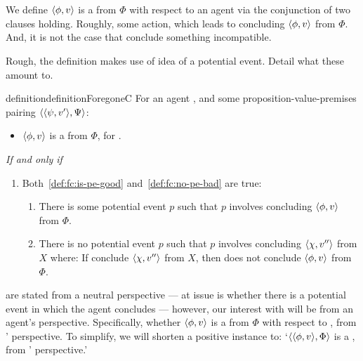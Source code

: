 \section{}
\label{cha:sec:fcs-def}

\begin{note}
  We define \(\langle \phi, v \rangle\) is a \emph{} from \(\Phi\) with respect to an agent via the conjunction of two clauses holding.
  Roughly, some action, which leads to concluding \(\langle \phi, v \rangle\) from \(\Phi\).
  And, it is not the case that conclude something incompatible.

  Rough, the definition makes use of idea of a potential event.
  Detail what these amount to.

  \begin{restatable}[A \fc{0}]{definition}{definitionForegoneC}
    \label{def:fc}
    For an agent \vAgent{}, and some proposition-value-premises pairing \(\langle \langle \psi, v' \rangle, \Psi \rangle\):

    \begin{itemize}
    \item
      \(\langle \phi, v \rangle\) is a \emph{} from \(\Phi\), for \vAgent{}.
    \end{itemize}
    \emph{If and only if}
    \begin{enumerate}[label=]
    \item
      Both~\ref{def:fc:is-pe-good} and~\ref{def:fc:no-pe-bad} are true:
      \begin{enumerate}[label=\alph*., ref=(\alph*)]
      \item
        \label{def:fc:is-pe-good}
        There is some potential event \(p\) such that \(p\) involves \vAgent{} concluding \(\langle \phi, v \rangle\) from \(\Phi\).
      \item
        \label{def:fc:no-pe-bad}
        There is no potential event \(p\) such that \(p\) involves \vAgent{} concluding
        \(\langle \chi, v'' \rangle\) from \(X\) where:
        If conclude \(\langle \chi, v'' \rangle\) from \(X\), then does not conclude \(\langle \phi, v \rangle\) from \(\Phi\).
      \end{enumerate}
    \end{enumerate}
    \vspace{-\baselineskip}
  \end{restatable}

   are stated from a neutral perspective --- at issue is whether there is a potential event in which the agent concludes --- however, our interest with  will be from an agent's perspective.
  Specifically, whether \(\langle \phi, v \rangle\) is a  from \(\Phi\) with respect to \vAgent{}, from \vAgent{}' perspective.
  To simplify, we will shorten a positive instance to:
  `\(\langle \langle \phi, v \rangle, \Phi \rangle\) is a , from \vAgent{}' perspective.'
\end{note}

